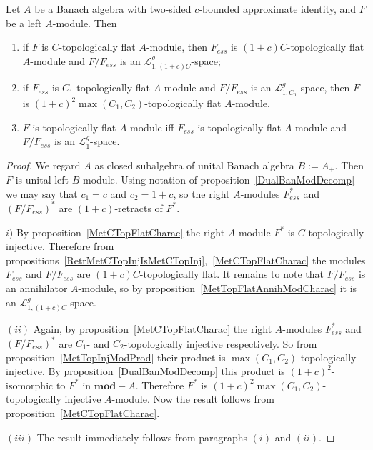 \begin{proposition}\label{TopFlatModCharac} Let $A$ be a Banach algebra with
two-sided $c$-bounded approximate identity, and $F$ be a left $A$-module. Then

\begin{enumerate}[label = (\roman*)]
    \item if $F$ is $C$-topologically flat $A$-module, then $F_{ess}$ is
    $(1+c)C$-topologically flat $A$-module and $F/F_{ess}$ is an
    $\mathscr{L}_{1,(1+c)C}^g$-space;

    \item if $F_{ess}$ is $C_1$-topologically flat $A$-module and $F/F_{ess}$ is
    an $\mathscr{L}_{1,C_1}^g$-space, then $F$ is ${(1+c)}^2\max(C_1,
    C_2)$-topologically flat $A$-module.

    \item $F$ is topologically flat $A$-module iff $F_{ess}$  is topologically
    flat $A$-module and $F/F_{ess}$ is an $\mathscr{L}_1^g$-space.
\end{enumerate}
\end{proposition}
\begin{proof} We regard $A$ as closed subalgebra of unital Banach algebra
$B:=A_+$. Then $F$ is unital left $B$-module. Using notation of
proposition~\ref{DualBanModDecomp} we may say that $c_1=c$ and $c_2=1+c$, so the
right $A$-modules $F_{ess}^*$ and ${(F/F_{ess})}^*$ are $(1+c)$-retracts of
$F^*$.

$i)$ By proposition~\ref{MetCTopFlatCharac} the right $A$-module $F^*$ is
$C$-topologically injective. Therefore from
propositions~\ref{RetrMetCTopInjIsMetCTopInj},~\ref{MetCTopFlatCharac} the modules
$F_{ess}$ and $F/F_{ess}$ are $(1+c)C$-topologically flat. It remains to note
that $F/F_{ess}$ is an annihilator $A$-module, so by
proposition~\ref{MetTopFlatAnnihModCharac} it is an
$\mathscr{L}_{1,(1+c)C}^g$-space.

$(ii)$ Again, by proposition~\ref{MetCTopFlatCharac} the right $A$-modules
$F_{ess}^*$ and ${(F/F_{ess})}^*$ are $C_1$- and $C_2$-topologically injective
respectively. So from proposition~\ref{MetTopInjModProd} their product is
$\max(C_1,C_2)$-topologically injective. By proposition~\ref{DualBanModDecomp}
this product is ${(1+c)}^2$-isomorphic to $F^*$ in $\mathbf{mod}-A$. Therefore
$F^*$ is ${(1+c)}^2\max(C_1, C_2)$-topologically injective $A$-module. Now the
result follows from proposition~\ref{MetCTopFlatCharac}.

$(iii)$ The result immediately follows from paragraphs $(i)$ and $(ii)$.
\end{proof}

